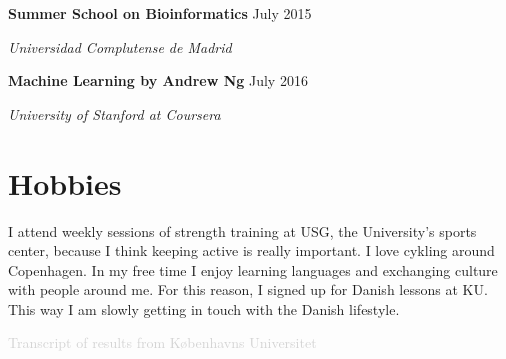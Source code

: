 \documentclass[paper=a4,fontsize=11pt]{article}
\newcommand{\NewPart}[1]{\section*{
{#1}}}
\newcommand{\SEntry}[3]{
		\noindent \textbf{#1} \hfill      %
		\textsf{#2} \par                  %
		\noindent \textit{#3} \par        %
		  \vspace{7.5pt}}
\begin{document}
\SEntry{Summer School on Bioinformatics}{July 2015}{Universidad Complutense de Madrid} 
  
\SEntry{Machine Learning by Andrew Ng}{July 2016}{University of Stanford at Coursera}


\NewPart{Hobbies}
I attend weekly sessions of strength training at USG, the University's sports center, because I think keeping active is really important. I love cykling around Copenhagen. In my free time I enjoy learning languages and exchanging culture with people around me. For this reason, I signed up for Danish lessons at KU. This way I am slowly getting in touch with the Danish lifestyle.



\vfill
\textcolor{lightgray}{Transcript of results from K{\o}benhavns Universitet}



\end{document}
